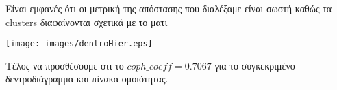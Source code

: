 Είναι εμφανές ότι οι μετρική της απόστασης που διαλέξαμε είναι σωστή
καθώς τα clusters διαφαίνονται σχετικά με το ματι

\noindent\begin{minipage}{\linewidth}
	\texttt{[image: images/dentroHier.eps]}
	\label{fig:Dentro}
\end{minipage}

Τέλος να προσθέσουμε ότι το $coph\_coeff = 0.7067$ για το συγκεκριμένο δεντροδιάγραμμα και πίνακα ομοιότητας.

